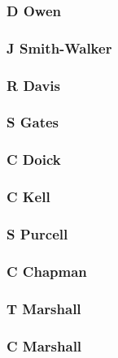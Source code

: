 \documentclass[letterpaper,10pt,english]{sphinxmanual}
\begin{document}
\subsubsection{D Owen}
\label{\detokenize{investors:d-owen}}

\subsubsection{J Smith-Walker}
\label{\detokenize{investors:j-smith-walker}}

\subsubsection{R Davis}
\label{\detokenize{investors:r-davis}}

\subsubsection{S Gates}
\label{\detokenize{investors:s-gates}}

\subsubsection{C Doick}
\label{\detokenize{investors:c-doick}}

\subsubsection{C Kell}
\label{\detokenize{investors:c-kell}}

\subsubsection{S Purcell}
\label{\detokenize{investors:s-purcell}}

\subsubsection{C Chapman}
\label{\detokenize{investors:c-chapman}}

\subsubsection{T Marshall}
\label{\detokenize{investors:t-marshall}}

\subsubsection{C Marshall}
\label{\detokenize{investors:c-marshall}}
\end{document}
